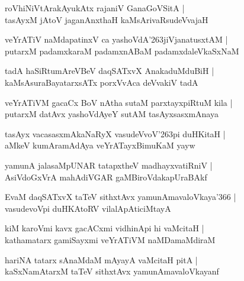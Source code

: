 \begin{shloka}
roVhiNiVtArakAyukAtx rajaniV GanaGoVSitA |\\
tasAyxM jAtoV jaganAnxthaH kaMsArivaRsudeVvajaH 
\end{shloka}

\begin{shloka}
veYrATiV naMdapatinxV ca yashoVdA\char'263jiVjanatusxtAM |\\
putarxM padamxkaraM padamxnABaM padamxdaleVkaSxNaM
\end{shloka}

\begin{shloka}
tadA haSiRtumAreVBeV daqSATxvX AnakaduMduBiH |\\
kaMsAsuraBayatarxsATx porxVvAca deVvakiV tadA
\end{shloka}

\begin{shloka}
veYrATiVM gacaCx BoV nAtha sutaM parxtayxpiRtuM kila |\\
putarxM datAvx yashoVdAyeY sutAM tasAyxsasxmAnaya
\end{shloka}

\begin{shloka}
tasAyx vacasasxmAkaNaRyX vasudeVvoV\char'263pi duHKitaH |\\
aMkeV kumAramAdAya veYrATayxBimuKaM yayw
\end{shloka}

\begin{shloka}
yamunA jalasaMpUNAR tatapxtheV madhayxvatiRniV |\\
AsiVdoGxVrA mahAdiVGAR gaMBiroVdakapUraBAkf
\end{shloka}

\begin{shloka}
EvaM daqSATxvX taTeV sithxtAvx yamunAmavaloVkaya\char'366 |\\
vasudevoVpi duHKAtoRV vilalApAticiMtayA
\end{shloka}

\begin{shloka}
kiM karoVmi kavx gacACxmi vidhinApi hi vaMcitaH |\\
kathamatarx gamiSayxmi veYrATiVM naMDamaMdiraM
\end{shloka}

\begin{shloka}
hariNA tatarx sAnaMdaM mAyayA vaMcitaH pitA |\\
kaSxNamAtarxM taTeV sithxtAvx yamunAmavaloVkayanf
\end{shloka}

